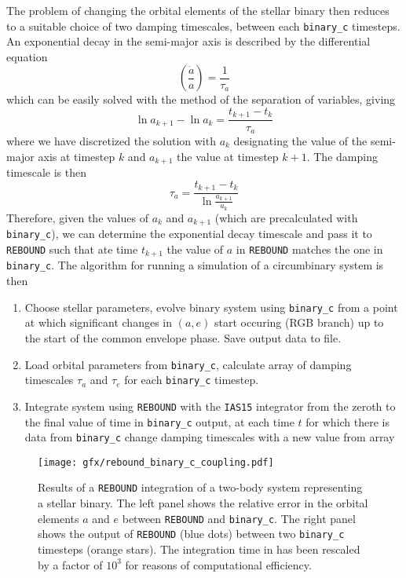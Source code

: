 \documentclass[ twoside,openright,titlepage,numbers=noenddot,headinclude,%
                footinclude=true,cleardoublepage=empty,abstractoff, %
                BCOR=5mm,paper=a4,fontsize=11pt,%
                american,%
                ]{scrreprt}
\begin{document}
The problem of changing the orbital elements of the stellar binary then reduces
to a suitable choice of two damping timescales, between each \texttt{binary\_c}
timesteps. An exponential decay in the semi-major axis is described by
the differential equation
\begin{equation}
    \left( \frac{\dot{a}}{a} \right)= \frac{1}{\tau_a} 
\end{equation}
which can be easily solved with the method of the separation of variables, giving
\begin{equation}
    \ln a_{k+1}-\ln a_k= \frac{t_{k+1}-t_k}{\tau_a} 
\end{equation}
where we have discretized the solution with $a_k$ designating the value of the
semi-major axis at timestep $k$ and $a_{k+1}$ the value at timestep $k+1$. The
damping timescale is then
\begin{equation}
    \tau_a = \frac{t_{k+1}-t_k}{\ln \frac{a_{k+1}}{a_k} } 
\end{equation}
Therefore, given the values of $a_k$ and $a_{k+1}$ (which are precalculated with
\texttt{binary\_c}), we can determine the exponential decay timescale and pass 
it to \texttt{REBOUND} such that ate time $t_{k+1}$ the value of $a$ in 
\texttt{REBOUND} matches the one in \texttt{binary\_c}. The algorithm for
running a simulation of a circumbinary system is then
\begin{enumerate}
    \item Choose stellar parameters, evolve binary system using \texttt{binary\_c}
        from a point at which significant changes in $(a,e)$ start occuring (RGB 
        branch) up to the start of the common envelope phase. Save output data
        to file.
    \item Load orbital parameters from \texttt{binary\_c}, calculate array of
        damping timescales $\tau_a$ and $\tau_e$ for each \texttt{binary\_c}
        timestep.
    \item Integrate system using \texttt{REBOUND} with the \texttt{IAS15} integrator
        from the zeroth to the final value of time in \texttt{binary\_c} output, at
        each time $t$ for which there is data from \texttt{binary\_c} change 
        damping timescales with a new value from array
\end{enumerate}
\begin{figure}[!t]
\centering
\texttt{[image: gfx/rebound\_binary\_c\_coupling.pdf]}
    \caption{Results of a \texttt{REBOUND} integration of a two-body system representing
    a stellar binary. The left panel shows the relative error in the orbital elements
    $a$ and $e$ between \texttt{REBOUND} and \texttt{binary\_c}. The right panel
    shows the output of \texttt{REBOUND} (blue dots) between two \texttt{binary\_c}
    timesteps (orange stars). The integration time in  has been
    rescaled by a factor of $10^3$ for reasons of computational efficiency.}
\label{fig:reb_bin_coupling}
\end{figure}
\end{document}
